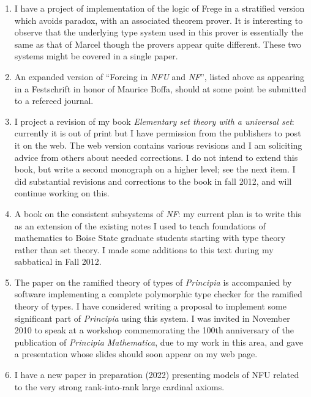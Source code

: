 \begin{description}
\begin{enumerate}
\item I have a project of implementation of the logic of Frege in a stratified version which avoids paradox,
with an associated theorem prover.  It is interesting to observe that the underlying type system used in this prover is essentially the same as that of Marcel though the provers appear quite different.  These two systems might be covered in a single paper.

\item An expanded version of ``Forcing in {\em NFU\/} and {\em
NF\/}'', listed above as appearing in a Festschrift in honor of
Maurice Boffa, should at some point be submitted to a refereed
journal.

\item I project a revision of my book {\em Elementary set theory with
a universal set\/}: currently it is out of print but I have permission
from the publishers to post it on the web.  The web version contains
various revisions and I am soliciting advice from others about needed
corrections.  I do not intend to extend this book, but write a second
monograph on a higher level; see the next item.  I did substantial revisions and corrections to the book in fall 2012, and will continue working on this.

\item A book on the consistent subsystems of {\em NF\/}: my current
plan is to write this as an extension of the existing notes I used to
teach foundations of mathematics to Boise State graduate students
starting with type theory rather than set theory.  I made some additions to this text during my sabbatical in Fall 2012.

\item The paper on the ramified theory of types of {\em Principia\/}
is accompanied by software implementing a complete polymorphic type
checker for the ramified theory of types.  I have considered writing a
proposal to implement some significant part of {\em Principia\/} using
this system.  I was invited in November 2010 to speak at a workshop
commemorating the 100th anniversary of the publication of {\em
Principia Mathematica\/}, due to my work in this area, and gave a
presentation whose slides should soon appear on my web page.

\item I have a new paper in preparation (2022) presenting models of NFU related to the very strong rank-into-rank large cardinal axioms.

\end{enumerate}

\end{description}





















